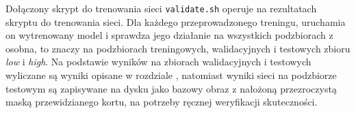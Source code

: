 Dołączony skrypt do trenowania sieci \texttt{validate.sh} operuje na rezultatach skryptu do trenowania sieci. Dla każdego przeprowadzonego treningu, uruchamia on wytrenowany model i sprawdza jego działanie na wszystkich podzbiorach z osobna, to znaczy na podzbiorach treningowych, walidacyjnych i testowych zbioru \textit{low} i \textit{high}. Na podstawie wyników na zbiorach walidacyjnych i testowych wyliczane są wyniki opisane w rozdziale , natomiast wyniki sieci na podzbiorze testowym są zapisywane na dysku jako bazowy obraz z nałożoną przezroczystą maską przewidzianego kortu, na potrzeby ręcznej weryfikacji skuteczności.
